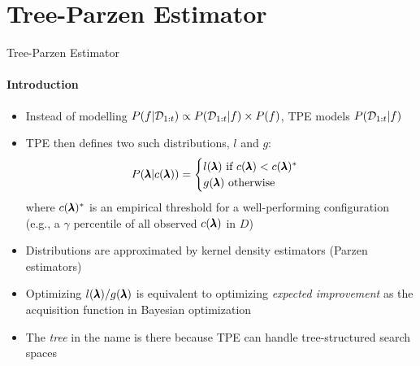\section{Tree-Parzen Estimator}
\begin{frame}[c]{Tree-Parzen Estimator}
\framesubtitle{Introduction}

\begin{itemize}
    \item Instead of modelling $
            P(f \vert \mathcal{D}_{1:t}) \propto P(\mathcal{D}_{1:t} \vert f) \times P(f)$, TPE models $P(\mathcal{D}_{1:t} \vert f)$
    \item TPE then defines two such distributions, $l$ and $g$:
        \begin{equation*}
            P(\pmb{\lambda} \vert c({\pmb{\lambda}})) = 
                \begin{cases}
                    l(\pmb{\lambda}) \text{ if } c({\pmb{\lambda}}) < c({\pmb{\lambda}})^*\\
                    g(\pmb{\lambda}) \text{ otherwise} 
                \end{cases}
        \end{equation*}
    where $c({\pmb{\lambda}})^*$ is an empirical threshold for a well-performing configuration (e.g., a $\gamma$ percentile of all observed $c({\pmb{\lambda}})$ in $D$)
    \item Distributions are approximated by kernel density estimators (Parzen estimators)
    \item Optimizing $l(\pmb{\lambda})/g(\pmb{\lambda})$ is equivalent to optimizing \emph{expected improvement} as the acquisition function in Bayesian optimization
    \item The \emph{tree} in the name is there because TPE can handle tree-structured search spaces 
        
\end{itemize}


\end{frame}
